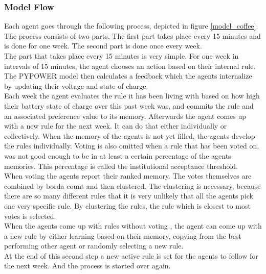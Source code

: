 \documentclass[a4paper]{article}
\begin{document}
\subsubsection{Model Flow}
Each agent goes through the following process, depicted in figure \ref{model_coffee}. The process consists of two parts. 
The first part takes place every 15 minutes and is done for one week. The second part is done once every week. \\
The part that takes place every 15 minutes is very simple.
For one week in intervals of 15 minutes, the agent 
chooses an action based on their internal rule. The PYPOWER model then calculates a feedback which the agents internalize
by updating their voltage and state of charge.\\
Each week the agent evaluates the rule it has been living with based on how 
high their battery state of charge over this past week was, and commits the rule and an associated preference value to 
its memory. 
Afterwards the agent comes up with a new rule for the next week. It can do that either individually or collectively. 
When the memory of the agents is not yet 
filled, the agents develop the rules individually. 
Voting is also omitted when a rule that has been voted on, was not good 
enough to be in at least a certain percentage of the agents memories. This percentage is called the institutional acceptance
threshold. \\
When voting the agents report their ranked memory. The votes themselves are combined by borda count and then clustered.  
The clustering is necessary, because there are so many different rules that it is very unlikely that all the agents 
pick one very specific rule. By clustering the rules, the rule which is closest to most votes is selected. \\
When the agents come up with rules without voting , the agent can come up with a new rule by either 
learning based on their memory, copying from the best performing other 
agent or randomly selecting a new rule. \\
At the end of this second step a new active rule is set for the agents to follow for the next week.
And the process is started over again.
\end{document}

